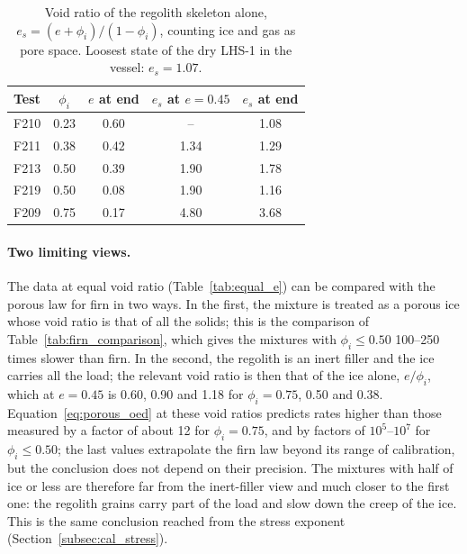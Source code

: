\begin{table}[H]
\centering
\small
\begin{tabular}{@{}lcccc@{}}
\toprule
Test & $\phi_i$ & $e$ at end & $e_s$ at $e = 0.45$ & $e_s$ at end \\
\midrule
F210 & 0.23 & 0.60 & -- & 1.08 \\
F211 & 0.38 & 0.42 & 1.34 & 1.29 \\
F213 & 0.50 & 0.39 & 1.90 & 1.78 \\
F219 & 0.50 & 0.08 & 1.90 & 1.16 \\
F209 & 0.75 & 0.17 & 4.80 & 3.68 \\
\bottomrule
\end{tabular}
\caption{Void ratio of the regolith skeleton alone, $e_s = (e+\phi_i)/(1-\phi_i)$, counting ice and gas as pore space. Loosest state of the dry LHS-1 in the vessel: $e_s = 1.07$.}
\label{tab:es}
\end{table}

\paragraph{Two limiting views.} The data at equal void ratio (Table~\ref{tab:equal_e}) can be compared with the porous law for firn in two ways. In the first, the mixture is treated as a porous ice whose void ratio is that of all the solids; this is the comparison of Table~\ref{tab:firn_comparison}, which gives the mixtures with $\phi_i\le0.50$ 100--250 times slower than firn. In the second, the regolith is an inert filler and the ice carries all the load; the relevant void ratio is then that of the ice alone, $e/\phi_i$, which at $e = 0.45$ is 0.60, 0.90 and 1.18 for $\phi_i = 0.75$, 0.50 and 0.38. Equation~\eqref{eq:porous_oed} at these void ratios predicts rates higher than those measured by a factor of about 12 for $\phi_i = 0.75$, and by factors of $10^5$--$10^7$ for $\phi_i\le0.50$; the last values extrapolate the firn law beyond its range of calibration, but the conclusion does not depend on their precision. The mixtures with half of ice or less are therefore far from the inert-filler view and much closer to the first one: the regolith grains carry part of the load and slow down the creep of the ice. This is the same conclusion reached from the stress exponent (Section~\ref{subsec:cal_stress}).

